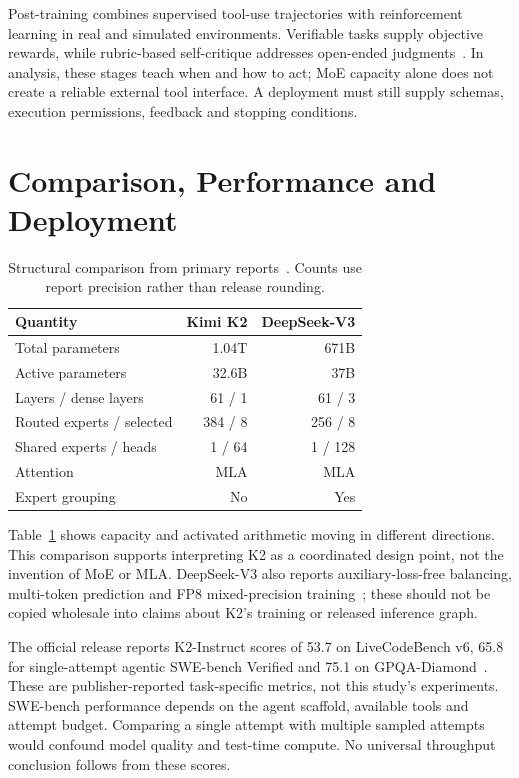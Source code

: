 \documentclass[conference]{IEEEtran}
\begin{document}
Post-training combines supervised tool-use trajectories with reinforcement learning in real and simulated environments. Verifiable tasks supply objective rewards, while rubric-based self-critique addresses open-ended judgments~\cite{blog}. In analysis, these stages teach when and how to act; MoE capacity alone does not create a reliable external tool interface. A deployment must still supply schemas, execution permissions, feedback and stopping conditions.

\section{Comparison, Performance and Deployment}
\begin{table}[t]
\caption{Structural comparison from primary reports~\cite{k2,v3}. Counts use report precision rather than release rounding.}
\centering\small
\begin{tabular}{lrr}\toprule
Quantity & Kimi K2 & DeepSeek-V3\\\midrule
Total parameters & 1.04T & 671B\\
Active parameters & 32.6B & 37B\\
Layers / dense layers & 61 / 1 & 61 / 3\\
Routed experts / selected & 384 / 8 & 256 / 8\\
Shared experts / heads & 1 / 64 & 1 / 128\\
Attention & MLA & MLA\\
Expert grouping & No & Yes\\\bottomrule
\end{tabular}
\label{tab:comparison}
\end{table}

Table~\ref{tab:comparison} shows capacity and activated arithmetic moving in different directions. This comparison supports interpreting K2 as a coordinated design point, not the invention of MoE or MLA. DeepSeek-V3 also reports auxiliary-loss-free balancing, multi-token prediction and FP8 mixed-precision training~\cite{v3}; these should not be copied wholesale into claims about K2's training or released inference graph.

The official release reports K2-Instruct scores of 53.7 on LiveCodeBench v6, 65.8 for single-attempt agentic SWE-bench Verified and 75.1 on GPQA-Diamond~\cite{repo}. These are publisher-reported task-specific metrics, not this study's experiments. SWE-bench performance depends on the agent scaffold, available tools and attempt budget. Comparing a single attempt with multiple sampled attempts would confound model quality and test-time compute. No universal throughput conclusion follows from these scores.
\end{document}
